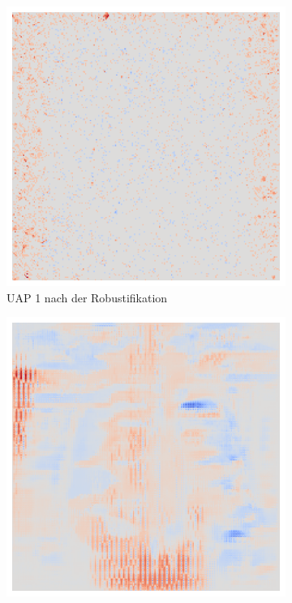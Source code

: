\begin{figure}[ht!]
\begin{subfigure}{0.19\linewidth}
        \includegraphics[height=1\linewidth]{01-images/05-resultate/uap_resnet/uap0-resnet18-mri-n200-robustificationslevel7.png}
        \caption{UAP 1 nach der Robustifikation}
    \end{subfigure}
    \hfill%
    \begin{subfigure}{0.19\linewidth}
        \centering
        \includegraphics[height=1\linewidth]{01-images/05-resultate/uap_efficientnet/uap0-efficientnetv2m-covid-n200-robustificationslevel0.png}

\end{subfigure}
\end{figure}
